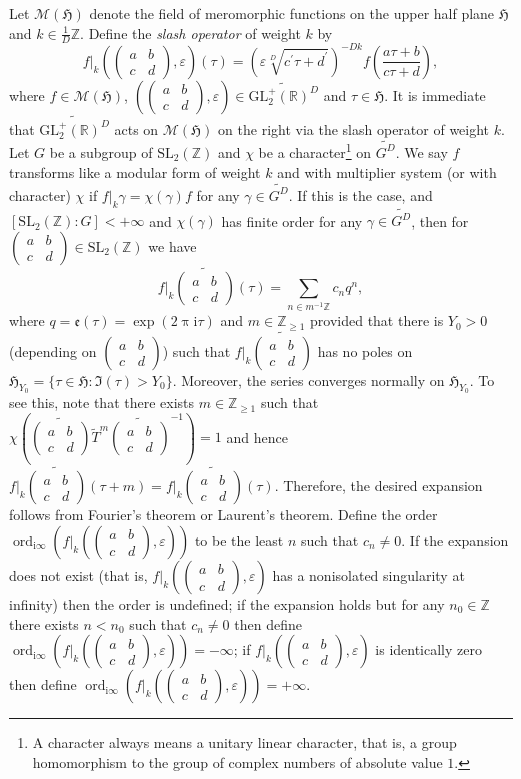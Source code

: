 \documentclass[12pt]{amsart}
\numberwithin{equation}{section}
\theoremstyle{plain}
\theoremstyle{definition}
\theoremstyle{remark}
\newcommand\rmi{\mathrm{i}}
\newcommand\tbtmat[4]{\left(\begin{smallmatrix}{#1} & {#2} \\ {#3} & {#4}\end{smallmatrix}\right)}
\newcommand\etp[1]{\mathfrak{e}\left(#1\right)}
\newcommand\ord{\mathop{\mathrm{ord}}}
\newcommand\numZ{\mathbb{Z}}
\newcommand\numgeq[2]{\mathbb{#1}_{\geq #2}}
\newcommand\slZ{\mathrm{SL}_2(\mathbb{Z})}
\newcommand\glpR{\mathrm{GL}_2^{+}(\mathbb{R})}
\newcommand\uhp{\mathfrak{H}}
\newcommand\elesltRaDs[5]{\left(\left(\begin{smallmatrix}{#1} & {#2} \\ {#3} & {#4}\end{smallmatrix}\right),{#5}\right)}
\newcommand\Dcover[2]{\widetilde{#1^{#2}}}
\begin{document}
Let $\mathscr{M}(\uhp)$ denote the field of meromorphic functions on the upper half plane $\uhp$ and $k\in\frac{1}{D}\numZ$. Define the \emph{slash operator} of weight $k$ by
\begin{equation*}
f\vert_k\elesltRaDs{a}{b}{c}{d}{\varepsilon}(\tau)=\left(\varepsilon\sqrt[D]{c^\prime\tau+d^\prime}\right)^{-Dk}f\left(\frac{a\tau+b}{c\tau+d}\right),
\end{equation*}
where $f\in\mathscr{M}(\uhp)$, $\elesltRaDs{a}{b}{c}{d}{\varepsilon}\in\Dcover{\glpR}{D}$ and $\tau\in\uhp$. It is immediate that $\Dcover{\glpR}{D}$ acts on $\mathscr{M}(\uhp)$ on the right via the slash operator of weight $k$. Let $G$ be a subgroup of $\slZ$ and $\chi$ be a character\footnote{A character always means a unitary linear character, that is, a group homomorphism to the group of complex numbers of absolute value $1$.} on $\Dcover{G}{D}$. We say $f$ transforms like a modular form of weight $k$ and with multiplier system (or with character) $\chi$ if $f\vert_k\gamma=\chi(\gamma)f$ for any $\gamma\in\Dcover{G}{D}$. If this is the case, and $[\slZ\colon G]<+\infty$ and $\chi(\gamma)$ has finite order for any $\gamma\in\Dcover{G}{D}$, then for $\tbtmat{a}{b}{c}{d}\in\slZ$ we have
\begin{equation*}
f\vert_k\widetilde{\tbtmat{a}{b}{c}{d}}(\tau)=\sum_{n\in m^{-1}\numZ}c_nq^n,
\end{equation*}
where $q=\etp{\tau}=\exp(2\uppi\rmi\tau)$ and $m\in\numgeq{Z}{1}$ provided that there is $Y_0>0$ (depending on $\tbtmat{a}{b}{c}{d}$) such that $f\vert_k\widetilde{\tbtmat{a}{b}{c}{d}}$ has no poles on $\uhp_{Y_0}=\{\tau\in\uhp\colon\Im(\tau)>Y_0\}$. Moreover, the series converges normally on $\uhp_{Y_0}$. To see this, note that there exists $m\in\numgeq{Z}{1}$ such that $\chi\left(\widetilde{\tbtmat{a}{b}{c}{d}}\widetilde{T}^m\widetilde{\tbtmat{a}{b}{c}{d}}^{-1}\right)=1$ and hence $f\vert_k\widetilde{\tbtmat{a}{b}{c}{d}}(\tau+m)=f\vert_k\widetilde{\tbtmat{a}{b}{c}{d}}(\tau)$. Therefore, the desired expansion follows from Fourier's theorem or Laurent's theorem. Define the order $\ord_{\rmi\infty}(f\vert_k(\tbtmat{a}{b}{c}{d},\varepsilon))$ to be the least $n$ such that $c_n \neq 0$. If the expansion does not exist (that is, $f\vert_k(\tbtmat{a}{b}{c}{d},\varepsilon)$ has a nonisolated singularity at infinity) then the order is undefined; if the expansion holds but for any $n_0\in\numZ$ there exists $n<n_0$ such that $c_n \neq 0$ then define $\ord_{\rmi\infty}(f\vert_k(\tbtmat{a}{b}{c}{d},\varepsilon))=-\infty$; if $f\vert_k(\tbtmat{a}{b}{c}{d},\varepsilon)$ is identically zero then define $\ord_{\rmi\infty}(f\vert_k(\tbtmat{a}{b}{c}{d},\varepsilon))=+\infty$.
\end{document}
